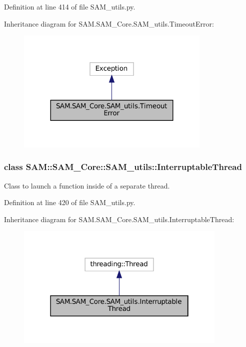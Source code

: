 Definition at line 414 of file S\+A\+M\+\_\+utils.\+py.



Inheritance diagram for S\+A\+M.\+S\+A\+M\+\_\+\+Core.\+S\+A\+M\+\_\+utils.\+Timeout\+Error\+:
\nopagebreak
\begin{figure}[H]
\begin{center}
\leavevmode
\includegraphics[width=263pt]{classSAM_1_1SAM__Core_1_1SAM__utils_1_1TimeoutError__inherit__graph}
\end{center}
\end{figure}
\label{classSAM_1_1SAM__Core_1_1SAM__utils_1_1InterruptableThread}
\subsubsection{class S\+AM\+:\+:S\+A\+M\+\_\+\+Core\+:\+:S\+A\+M\+\_\+utils\+:\+:Interruptable\+Thread}
Class to launch a function inside of a separate thread. 

Definition at line 420 of file S\+A\+M\+\_\+utils.\+py.



Inheritance diagram for S\+A\+M.\+S\+A\+M\+\_\+\+Core.\+S\+A\+M\+\_\+utils.\+Interruptable\+Thread\+:
\nopagebreak
\begin{figure}[H]
\begin{center}
\leavevmode
\includegraphics[width=286pt]{classSAM_1_1SAM__Core_1_1SAM__utils_1_1InterruptableThread__inherit__graph}
\end{center}
\end{figure}
